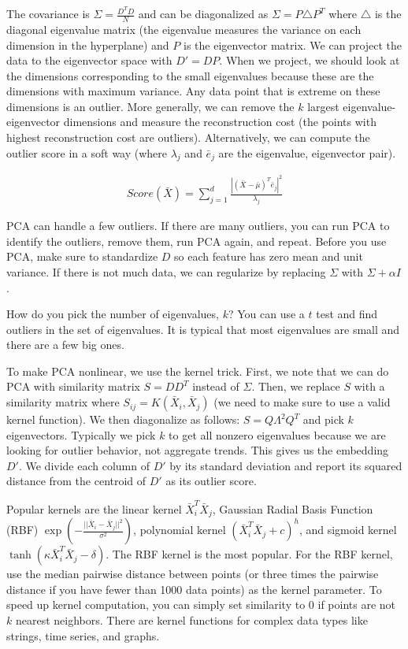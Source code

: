 \documentclass[a4paper]{article}
\begin{document}
The covariance is $\Sigma = \frac{D^T D}{N}$ and can be diagonalized as
$\Sigma = P \triangle P^T$ where $\triangle$ is the diagonal eigenvalue matrix
(the eigenvalue measures the variance on each dimension in the hyperplane)
and $P$ is the eigenvector matrix. We can project the data to the eigenvector
space with $D' = DP$. When we project, we should look at the dimensions
corresponding to the small eigenvalues because these are the dimensions with
maximum variance. Any data point that is extreme on these dimensions is an
outlier. More generally, we can remove the $k$ largest eigenvalue-eigenvector
dimensions and measure the reconstruction cost (the points with highest
reconstruction cost are outliers). Alternatively, we can compute the outlier
score in a soft way (where $\lambda_j$ and $\bar{e}_j$ are the eigenvalue,
eigenvector pair).

\begin{align}
  Score(\bar{X}) = \sum_{j=1}^{d}{\frac{|(\bar{X} - \bar{\mu})^T \bar{e}_j|^2}{
  \lambda_j}}
\end{align}

PCA can handle a few outliers. If there are many outliers, you can run PCA to
identify the outliers, remove them, run PCA again, and repeat. Before you
use PCA, make sure to standardize $D$ so each feature has zero mean and unit
variance. If there is not much data, we can regularize by replacing $\Sigma$
with $\Sigma + \alpha I$.

How do you pick the number of eigenvalues, $k$? You can use a $t$ test and
find outliers in the set of eigenvalues. It is typical that most eigenvalues
are small and there are a few big ones.

To make PCA nonlinear, we use the kernel trick. First, we note that we can
do PCA with similarity matrix $S = D D^T$ instead of $\Sigma$. Then, we
replace $S$ with a similarity matrix where $S_{ij} =
K(\bar{X}_i, \bar{X}_j)$ (we need to make sure to use a valid kernel function).
We then diagonalize as follows: $S = Q \Lambda^2 Q^T$ and pick $k$
eigenvectors. Typically we pick $k$ to get all nonzero eigenvalues because we
are looking for outlier behavior, not aggregate trends. This gives us the
embedding $D'$. We divide each column of $D'$ by its standard deviation and
report its squared distance from the centroid of $D'$ as its outlier score.

Popular kernels are the linear kernel $\bar{X}_i^T \bar{X}_j$,
Gaussian Radial Basis Function (RBF)
$\exp{(-\frac{||\bar{X}_i - \bar{X}_j||^2}{\sigma^2})}$, polynomial kernel
$(\bar{X}_i^T \bar{X}_j + c)^h$, and sigmoid kernel $\tanh{(\kappa \bar{X}_i^T
\bar{X}_j - \delta)}$. The RBF kernel is the most popular. For the RBF kernel,
use the median pairwise distance between points (or three times the pairwise
distance if you have fewer than 1000 data points) as the kernel
parameter. To speed up kernel
computation, you can simply set similarity to 0 if points are not $k$
nearest neighbors. There are kernel functions for complex data types like
strings, time series, and graphs.
\end{document}

